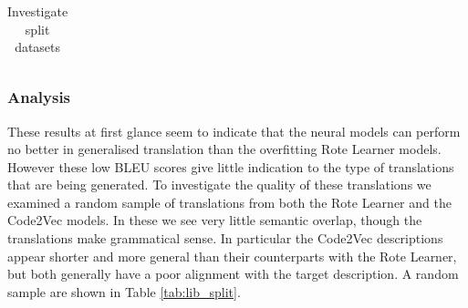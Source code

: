 \begin{table}[!ht]
\begin{center}
\begin{tabular}{ c | c | c }
    \hline
\end{tabular}
\caption {Investigate split datasets}
\label{table:split_datasets_embed}
\end{center}
\end{table}




\subsubsection{Analysis}

These results at first glance seem to indicate that the neural models can perform no better in generalised translation than the overfitting Rote Learner models.
However these low BLEU scores give little indication to the type of translations that are being generated.
To investigate the quality of these translations we examined a random sample of translations from both the Rote Learner and the Code2Vec models. 
In these we see very little semantic overlap, though the translations make grammatical sense. 
In particular the Code2Vec descriptions appear shorter and more general than their counterparts with the Rote Learner, but both generally have a poor alignment with the target description. 
A random sample are shown in Table \ref{tab:lib_split}.



